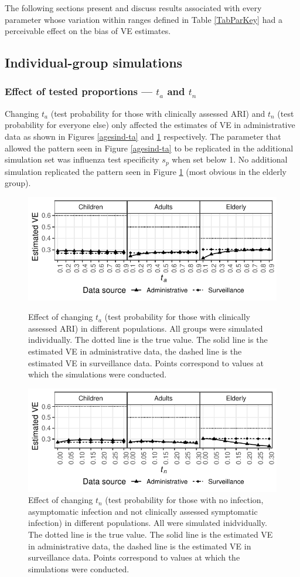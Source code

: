 \documentclass[11pt]{article}
\begin{document}
The following sections present and discuss results associated with every parameter whose variation within ranges defined in Table \ref{TabParKey} had a perceivable effect on the bias of VE estimates.

\subsection{Individual-group simulations}

\subsubsection{Effect of tested proportions --- $t_a$ and $t_n$}

Changing $t_a$ (test probability for those with clinically assessed ARI) and $t_n$ (test probability for everyone else) only affected the estimates of VE in administrative data as shown in Figures \ref{agesind-ta} and \ref{agesind-tn} respectively. The parameter that allowed the pattern seen in Figure \ref{agesind-ta} to be replicated in the additional simulation set was influenza test specificity $s_p$ when set below 1. No additional simulation replicated the pattern seen in Figure \ref{agesind-tn} (most obvious in the elderly group).

\begin{figure}[H]
	\centering
		\includegraphics[width=.75\linewidth]{../fig-agesind/agesind-test_clin.pdf}
		\caption{
Effect of changing $t_a$ (test probability for those with clinically assessed ARI) in different populations. All groups were simulated individually. The dotted line is the true value. The solid line is the estimated VE in administrative data, the dashed line is the estimated VE in surveillance data. Points correspond to values at which the simulations were conducted. \label{agesind-ta}
		}
		\includegraphics[width=.75\linewidth]{../fig-agesind/agesind-test_nonclin.pdf}
		\caption{
Effect of changing $t_n$ (test probability for those with no infection, asymptomatic infection and not clinically assessed symptomatic infection) in different populations. All were simulated inidvidually. The dotted line is the true value. The solid line is the estimated VE in administrative data, the dashed line is the estimated VE in surveillance data. Points correspond to values at which the simulations were conducted. \label{agesind-tn}
		}
\end{figure}
\end{document}
